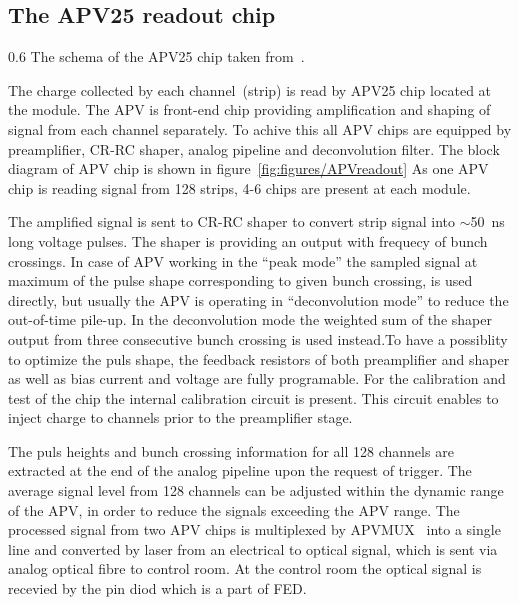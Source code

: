 

\subsection{The APV25 readout chip \label{sec:APV}}


                 {0.6}       %
                 {The schema of the APV25 chip taken from~\cite{Friedl:2001kra}.} %

The charge collected by each channel~(strip) is read by APV25 chip located at the module. The APV is front-end chip providing amplification and shaping of signal from each channel separately. To achive this all APV chips are equipped by preamplifier, CR-RC shaper, analog pipeline and deconvolution filter. The block diagram of APV chip is shown in figure~\ref{fig:figures/APVreadout} As one APV chip is reading signal from 128 strips, 4-6 chips are present at each module.

The amplified signal is sent to CR-RC shaper to convert strip signal into $\sim$50~ns long voltage pulses. The shaper is providing an output with frequecy of bunch crossings. In case of APV working in the ``peak mode'' the sampled signal at maximum of the pulse shape corresponding to given bunch crossing, is used directly, but usually the APV is operating in ``deconvolution mode'' to reduce the out-of-time pile-up. In the deconvolution mode the weighted sum of the shaper output from three consecutive bunch crossing is used instead.To have a possiblity to optimize the puls shape, the feedback resistors of both preamplifier and shaper as well as  bias current and voltage are fully programable. For the calibration and test of the chip the internal calibration circuit is present. This circuit enables to inject charge to channels prior to the preamplifier stage.

The puls heights and bunch crossing information for all 128 channels are extracted at the end of the analog pipeline upon the request of trigger. The average signal level from 128 channels can be adjusted within the dynamic range of the APV, in order to reduce the signals exceeding the APV range. The processed signal from two APV chips is multiplexed by APVMUX~\cite{Ball:2007zza} into a single line and converted by laser from an electrical to optical signal, which is sent via analog optical fibre to control room. At the control room the optical signal is recevied by the pin diod which is a part of FED.

